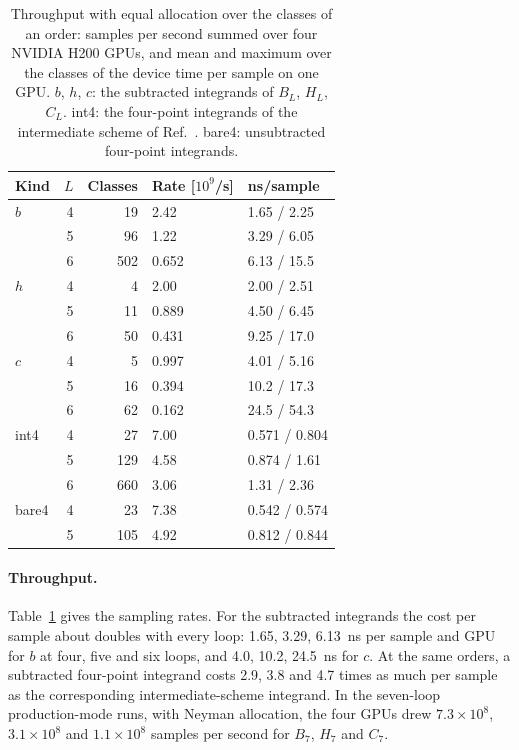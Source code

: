 \begin{table}
\caption{\label{tab:throughput}%
Throughput with equal allocation over the classes of an order: samples per second summed over four NVIDIA H200
GPUs, and mean and maximum over the classes of the
device time per sample on one GPU. $b$, $h$, $c$: the subtracted integrands of $B_L$, $H_L$, $C_L$.
int4: the four-point integrands of the intermediate scheme of Ref.~\cite{Phi4tools2024}. bare4: unsubtracted
four-point integrands.}
\begin{ruledtabular}
\begin{tabular}{lrrll}
Kind & $L$ & Classes & Rate [$10^9$/s] & ns/sample \\
\hline
$b$    & 4 & 19  & 2.42  & 1.65 / 2.25 \\
       & 5 & 96  & 1.22  & 3.29 / 6.05 \\
       & 6 & 502 & 0.652 & 6.13 / 15.5 \\
$h$    & 4 & 4   & 2.00  & 2.00 / 2.51 \\
       & 5 & 11  & 0.889 & 4.50 / 6.45 \\
       & 6 & 50  & 0.431 & 9.25 / 17.0 \\
$c$    & 4 & 5   & 0.997 & 4.01 / 5.16 \\
       & 5 & 16  & 0.394 & 10.2 / 17.3 \\
       & 6 & 62  & 0.162 & 24.5 / 54.3 \\
int4   & 4 & 27  & 7.00 & 0.571 / 0.804 \\
       & 5 & 129 & 4.58 & 0.874 / 1.61 \\
       & 6 & 660 & 3.06 & 1.31 / 2.36 \\
bare4  & 4 & 23  & 7.38 & 0.542 / 0.574 \\
       & 5 & 105 & 4.92 & 0.812 / 0.844 \\
\end{tabular}
\end{ruledtabular}
\end{table}

\paragraph{Throughput.}
Table~\ref{tab:throughput} gives the sampling rates. For the subtracted integrands the cost per sample about doubles
with every loop: 1.65, 3.29, 6.13~ns per sample and GPU for $b$ at four, five and six loops, and
4.0, 10.2, 24.5~ns for $c$. At the same orders, a subtracted four-point integrand costs
2.9, 3.8 and 4.7 times as much per sample as the corresponding intermediate-scheme integrand. In the
seven-loop production-mode runs, with Neyman allocation, the four GPUs drew $7.3\times10^{8}$,
$3.1\times10^{8}$ and $1.1\times10^{8}$ samples per second for $B_7$, $H_7$ and $C_7$.

